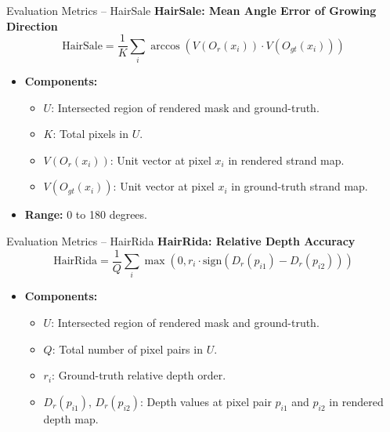 \begin{frame}[t]{Evaluation Metrics -- HairSale}
    \textbf{HairSale: Mean Angle Error of Growing Direction}
    \begin{equation*}
        \text{HairSale} = \frac{1}{K} \sum_{i} \arccos\left( V(O_r(x_i)) \cdot V(O_{gt}(x_i)) \right)
    \end{equation*}
    \begin{itemize}
        \item \textbf{Components:}
        \begin{itemize}
            \item \(U\): Intersected region of rendered mask and ground-truth.
            \item \(K\): Total pixels in \(U\).
            \item \(V(O_r(x_i))\): Unit vector at pixel \(x_i\) in rendered strand map.
            \item \(V(O_{gt}(x_i))\): Unit vector at pixel \(x_i\) in ground-truth strand map.
        \end{itemize}
        \item \textbf{Range:} 0 to 180 degrees.
    \end{itemize}
\end{frame}


\begin{frame}[t]{Evaluation Metrics -- HairRida}
    \textbf{HairRida: Relative Depth Accuracy}
    \begin{equation*}
        \text{HairRida} = \frac{1}{Q} \sum_{i} \max(0, r_i \cdot \text{sign}(D_r(p_{i1}) - D_r(p_{i2})))
    \end{equation*}
    \begin{itemize}
        \item \textbf{Components:}
        \begin{itemize}
            \item \(U\): Intersected region of rendered mask and ground-truth.
            \item \(Q\): Total number of pixel pairs in \(U\).
            \item \(r_i\): Ground-truth relative depth order.
            \item \(D_r(p_{i1})\), \(D_r(p_{i2})\): Depth values at pixel pair \(p_{i1}\) and \(p_{i2}\) in rendered depth map.
        \end{itemize}
    \end{itemize}
\end{frame}


